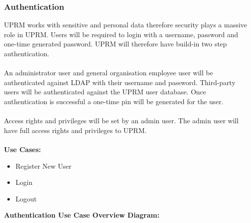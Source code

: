 
\subsubsection{Authentication}
UPRM works with sensitive and personal data therefore security plays a massive role in UPRM.
Users will be required to login with a username, password and one-time generated password. UPRM will therefore have build-in two step authentication. \\ \\
An administrator user and general organisation employee user will be authenticated against LDAP with their username and password. Third-party users will be authenticated against the UPRM user database. Once authentication is successful a one-time pin will be generated for the user.\\ \\
Access rights and privileges will be set by an admin user. The admin user will have full access rights and privileges to UPRM.\\ \\
\textbf{Use Cases:}
\begin{itemize}
	\item Register New User
	\item Login
	\item Logout \\
\end{itemize}
\textbf{Authentication Use Case Overview Diagram:}\\
\centerline{}


